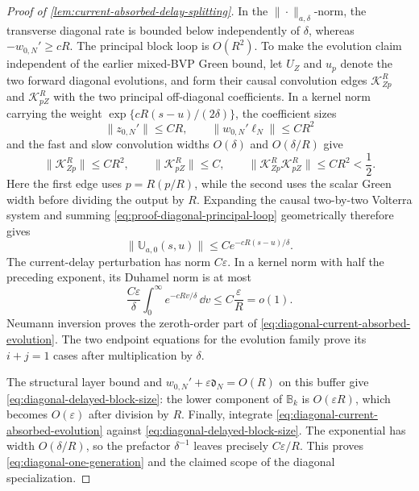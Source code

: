 \begin{proof}[Proof of
\cref{lem:current-absorbed-delay-splitting}]
In the \(\|\cdot\|_{a,\delta}\)-norm, the transverse diagonal rate is
bounded below independently of \(\delta\), whereas
\(-w_{0,N}'\ge cR\).  The principal block loop is \(O(R^2)\).
To make the evolution claim independent of the earlier mixed-BVP Green
bound, let \(U_Z\) and \(u_p\) denote the two forward diagonal evolutions,
and form their causal convolution edges
\(\mathcal K_{Zp}^R\) and \(\mathcal K_{pZ}^R\) with the two principal
off-diagonal coefficients.  In a kernel norm carrying the weight
\(\exp\{cR(s-u)/(2\delta)\}\), the coefficient sizes
\[
 \|z_{0,N}'\|\le CR,\qquad
 \|w_{0,N}'\ell_N\|\le CR^2
\]
and the fast and slow convolution widths \(O(\delta)\) and
\(O(\delta/R)\) give
\begin{equation}
 \|\mathcal K_{Zp}^R\|\le CR^2,\qquad
 \|\mathcal K_{pZ}^R\|\le C,\qquad
 \|\mathcal K_{Zp}^R\mathcal K_{pZ}^R\|
 \le CR^2<\frac12.                               \label{eq:proof-diagonal-principal-loop}
\end{equation}
Here the first edge uses \(p=R(p/R)\), while the second uses the scalar
Green width before dividing the output by \(R\).  Expanding the causal
two-by-two Volterra system and summing
\cref{eq:proof-diagonal-principal-loop} geometrically therefore gives
\[
 \|\mathbb U_{a,0}(s,u)\|
 \le C e^{-cR(s-u)/\delta}.
\]
The current-delay perturbation has norm \(C\varepsilon\).  In a kernel
norm with half the preceding exponent, its Duhamel norm is at most
\[
 \frac{C\varepsilon}{\delta}
   \int_0^\infty e^{-cRv/\delta}\,\dd v
 \le C\frac{\varepsilon}{R}=o(1).
\]
Neumann inversion proves the zeroth-order part of
\cref{eq:diagonal-current-absorbed-evolution}.  The two endpoint equations
for the evolution family prove its \(i+j=1\) cases after multiplication
by \(\delta\).

The structural layer bound and
\(w_{0,N}'+\varepsilon\mathfrak d_N=O(R)\) on this buffer give
\cref{eq:diagonal-delayed-block-size}: the lower component of
\(\mathbb B_k\) is \(O(\varepsilon R)\), which becomes
\(O(\varepsilon)\) after division by \(R\).  Finally, integrate
\cref{eq:diagonal-current-absorbed-evolution} against
\cref{eq:diagonal-delayed-block-size}.  The exponential has width
\(O(\delta/R)\), so the prefactor \(\delta^{-1}\) leaves precisely
\(C\varepsilon/R\).  This proves
\cref{eq:diagonal-one-generation} and the claimed scope of the diagonal
specialization.
\end{proof}

